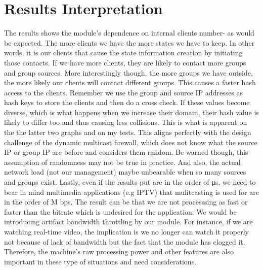 \section{Results Interpretation}
The results shows the module's dependence on internal clients number- as would
be expected. The more clients we have the more states we have to keep. In other
words, it is our clients that cause the state information creation by initiating those
contacts. If we have more clients, they are likely to contact more groups and group
sources.
More interestingly though, the more groups we have outside, the more likely
our clients will contact different groups. This causes a faster hash access to the
clients. Remember we use the group and source IP addresses as hash keys to store
the clients and then do a cross check. If these values become diverse, which is
what happens when we increase their domain, their hash value is likely to differ
too and thus causing less collisions. This is what is apparent on the the latter
two graphs and on my tests. This aligns perfectly with the design challenge of
the dynamic multicast firewall, which does not know what the source IP or group
IP are before and considers them random. Be warned though, this assumption of
randomness may not be true in practice. And also, the actual network load (not
our management) maybe unbearable when so many sources and groups exist.
Lastly, even if the results put are in the order of μs, we need to bear in mind
multimedia applications (e.g IPTV) that mulitcasting is used for are in the order of
M bps. The result can be that we are not processsing as fast or faster than the bitrate
which is undesired for the application. We would be introducing artifact bandwidth
throttling by our module. For instance, if we are watching real-time video, the
implication is we no longer can watch it properly not because of lack of bandwidth
but the fact that the module has clogged it. Therefore, the machine's raw processing
power and other features are also important in these type of situations and need
considerations.

